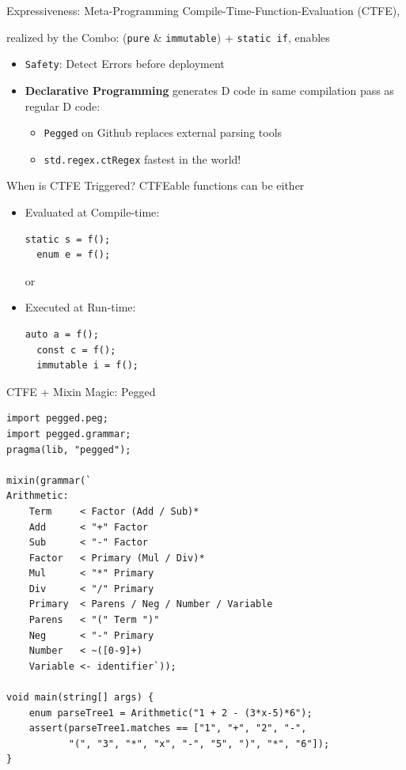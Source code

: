 \documentclass[xcolor=dvipsnames]{beamer}
\begin{document}
\begin{frame}[fragile]{Expressiveness: Meta-Programming}
  Compile-Time-Function-Evaluation (CTFE),
  \item realized by the Combo:
  (\texttt{pure} \& \texttt{immutable}) + \texttt{static if}, enables
  \begin{itemize}[<+->]
  \item \texttt{Safety}: Detect Errors before deployment
  \item \textbf{Declarative Programming} generates D code in same compilation
    pass as regular D code:
    \begin{itemize}[<+->]
    \item \texttt{Pegged} on Github replaces external parsing tools
    \item \texttt{std.regex.ctRegex} fastest in the world!
    \end{itemize}
  \end{itemize}
\end{frame}

\begin{frame}[fragile]{When is CTFE Triggered?}
  CTFEable functions can be either
  \begin{itemize}[<+->]
  \item Evaluated at Compile-time:
\begin{lstlisting}[frame=single]
  static s = f();
  enum e = f();
\end{lstlisting}
or
  \item Executed at Run-time:
\begin{lstlisting}[frame=single]
  auto a = f();
  const c = f();
  immutable i = f();
\end{lstlisting}
  \end{itemize}
\end{frame}

\begin{frame}[fragile]{CTFE + Mixin Magic: Pegged}
\footnotesize
\begin{lstlisting}[frame=single]
import pegged.peg;
import pegged.grammar;
pragma(lib, "pegged");

mixin(grammar(`
Arithmetic:
    Term     < Factor (Add / Sub)*
    Add      < "+" Factor
    Sub      < "-" Factor
    Factor   < Primary (Mul / Div)*
    Mul      < "*" Primary
    Div      < "/" Primary
    Primary  < Parens / Neg / Number / Variable
    Parens   < "(" Term ")"
    Neg      < "-" Primary
    Number   < ~([0-9]+)
    Variable <- identifier`));

void main(string[] args) {
    enum parseTree1 = Arithmetic("1 + 2 - (3*x-5)*6");
    assert(parseTree1.matches == ["1", "+", "2", "-",
           "(", "3", "*", "x", "-", "5", ")", "*", "6"]);
}
\end{lstlisting}
\end{frame}
\end{document}
